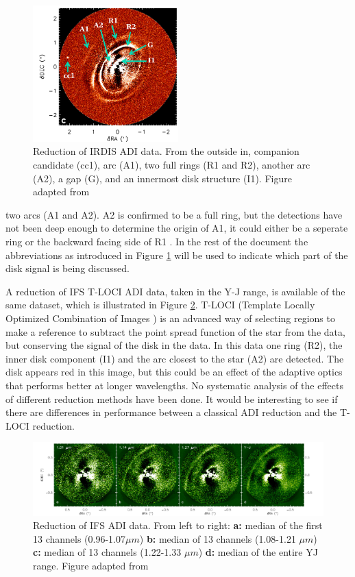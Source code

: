 \documentclass[twoside,single,12pt]{lion-msc}
\begin{document}
\begin{figure}
\includegraphics[width = 0.5\textwidth]{irdisjos}
\caption{Reduction of IRDIS ADI data. From the outside in, companion candidate (cc1), arc (A1), two full rings (R1 and R2), another arc (A2), a gap (G), and an innermost disk structure (I1). Figure adapted from \citep{DeBoer2016}}
\label{fig:irdisjos}
\vspace{-7mm}
\end{figure}

\noindent
two arcs (A1 and A2). A2 is confirmed to be a full ring, but the detections have not been deep enough to determine the origin of A1, it could either be a seperate ring or the backward facing side of R1 \citep{DeBoer2016}. In the rest of the document the abbreviations as introduced in Figure \ref{fig:irdisjos} will be used to indicate which part of the disk signal is being discussed.
\bigskip

A reduction of IFS T-LOCI ADI data, taken in the Y-J range, is available of the same dataset, which is illustrated in Figure \ref{fig:ifsjos}. T-LOCI (Template Locally Optimized Combination of Images \citep{Marois2010}) is an advanced way of selecting regions to make a reference to subtract the point spread function of the star from the data, but conserving the signal of the disk in the data. In this data one ring (R2), the inner disk component (I1) and the arc closest to the star (A2) are detected. The disk appears red in this image, but this could be an effect of the adaptive optics that performs better at longer wavelengths. No systematic analysis of the effects of different reduction methods have been done. It would be interesting to see if there are differences in performance between a classical ADI reduction and the T-LOCI reduction.
\bigskip

\begin{figure}[!b]
\includegraphics[width = 1.05\textwidth]{ifsjos}
\caption{Reduction of IFS ADI data. From left to right: \textbf{a:} median of the first 13 channels (0.96-1.07$\mu m$) \textbf{b:} median of 13 channels (1.08-1.21 $\mu m$) \textbf{c:} median of 13 channels (1.22-1.33 $\mu m$) \textbf{d:} median of the entire YJ range. Figure adapted from \citep{DeBoer2016}}
\label{fig:ifsjos}
\end{figure}
\end{document}
